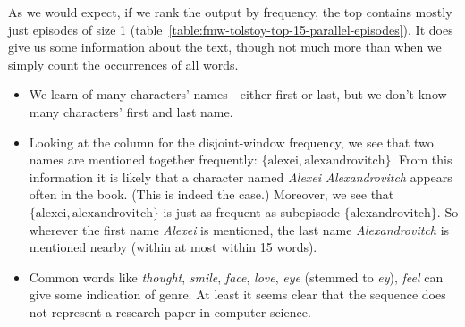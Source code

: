 As we would expect, if we rank the output by frequency, the top contains mostly just episodes of size 1 (table~\ref{table:fmw-tolstoy-top-15-parallel-episodes}). It does give us some information about the text, though not much more than when we simply count the occurrences of all words.

\begin{itemize}
\item We learn of many characters' names---either first or last, but we don't know many characters' first and last name.
\item Looking at the column for the disjoint-window frequency, we see that two names are mentioned together frequently: $ \{ \text{alexei}, \text{alexandrovitch} \} $. From this information it is likely that a character named \emph{Alexei Alexandrovitch} appears often in the book. (This is indeed the case.) Moreover, we see that $ \{ \text{alexei}, \text{alexandrovitch} \} $ is just as frequent as subepisode $ \{ \text{alexandrovitch} \} $. So wherever the first name \emph{Alexei} is mentioned, the last name \emph{Alexandrovitch} is mentioned nearby (within at most within 15 words).
\item Common words like \emph{thought}, \emph{smile}, \emph{face}, \emph{love}, \emph{eye} (stemmed to \emph{ey}), \emph{feel} can give some indication of genre. At least it seems clear that the sequence does not represent a research paper in computer science.

\end{itemize}

